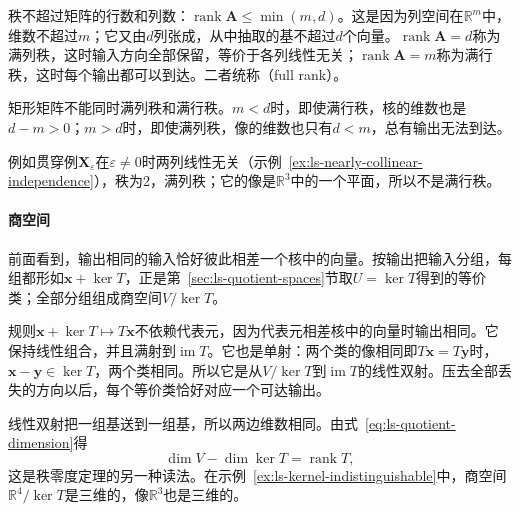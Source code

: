 秩不超过矩阵的行数和列数：$\operatorname{rank}\bm A\leq\min(m,d)$。这是因为列空间在$\mathbb R^m$中，维数不超过$m$；它又由$d$列张成，从中抽取的基不超过$d$个向量。$\operatorname{rank}\bm A=d$称为满列秩，这时输入方向全部保留，等价于各列线性无关；$\operatorname{rank}\bm A=m$称为满行秩，这时每个输出都可以到达。二者统称（full rank）。

矩形矩阵不能同时满列秩和满行秩。$m<d$时，即使满行秩，核的维数也是$d-m>0$；$m>d$时，即使满列秩，像的维数也只有$d<m$，总有输出无法到达。

例如贯穿例$\bm X_\varepsilon$在$\varepsilon\neq0$时两列线性无关（示例~\ref{ex:ls-nearly-collinear-independence}），秩为$2$，满列秩；它的像是$\mathbb R^3$中的一个平面，所以不是满行秩。

\paragraph{商空间}
前面看到，输出相同的输入恰好彼此相差一个核中的向量。按输出把输入分组，每组都形如$\bm x+\ker T$，正是第~\ref{sec:ls-quotient-spaces}节取$U=\ker T$得到的等价类；全部分组组成商空间$V/\ker T$。

规则$\bm x+\ker T\mapsto T\bm x$不依赖代表元，因为代表元相差核中的向量时输出相同。它保持线性组合，并且满射到$\operatorname{im}T$。它也是单射：两个类的像相同即$T\bm x=T\bm y$时，$\bm x-\bm y\in\ker T$，两个类相同。所以它是从$V/\ker T$到$\operatorname{im}T$的线性双射。压去全部丢失的方向以后，每个等价类恰好对应一个可达输出。

线性双射把一组基送到一组基，所以两边维数相同。由式~\eqref{eq:ls-quotient-dimension}得
\[
 \dim V-\dim\ker T=\operatorname{rank}T,
\]
这是秩零度定理的另一种读法。在示例~\ref{ex:ls-kernel-indistinguishable}中，商空间$\mathbb R^4/\ker T$是三维的，像$\mathbb R^3$也是三维的。

